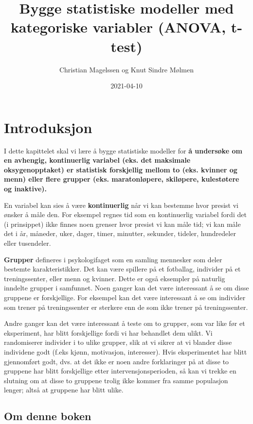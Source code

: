 \documentclass[
]{book}
\title{Bygge statistiske modeller med kategoriske variabler (ANOVA, t-test)}
\author{Christian Magelssen og Knut Sindre Mølmen}
\date{2021-04-10}
\begin{document}
\maketitle

{
\setcounter{tocdepth}{1}
\tableofcontents
}
\hypertarget{intro}{%
\chapter{Introduksjon}\label{intro}}

I dette kapittelet skal vi lære å bygge statistiske modeller for \textbf{å undersøke om en avhengig, kontinuerlig variabel (eks. det maksimale oksygenopptaket) er statistisk forskjellig mellom to (eks. kvinner og menn) eller flere grupper (eks. maratonløpere, skiløpere, kulestøtere og inaktive).}

En variabel kan sies å være \textbf{kontinuerlig} når vi kan bestemme hvor presist vi ønsker å måle den. For eksempel regnes tid som en kontinuerlig variabel fordi det (i prinsippet) ikke finnes noen grenser hvor presist vi kan måle tid; vi kan måle det i år, måneder, uker, dager, timer, minutter, sekunder, tideler, hundredeler eller tusendeler.

\textbf{Grupper} defineres i psykologifaget som en samling mennesker som deler bestemte karakteristikker. Det kan være spillere på et fotballag, individer på et treningssenter, eller menn og kvinner. Dette er også eksempler på naturlig inndelte grupper i samfunnet. Noen ganger kan det være interessant å se om disse gruppene er forskjellige. For eksempel kan det være interessant å se om individer som trener på treningssenter er sterkere enn de som ikke trener på treningssenter.

Andre ganger kan det være interessant å teste om to grupper, som var like før et eksperiment, har blitt forskjellige fordi vi har behandlet dem ulikt. Vi randomiserer individer i to ulike grupper, slik at vi sikrer at vi blander disse individene godt (f.eks kjønn, motivasjon, interesser). Hvis eksperimentet har blitt gjennomført godt, dvs. at det ikke er noen andre forklaringer på at disse to gruppene har blitt forskjellige etter intervensjonsperioden, så kan vi trekke en slutning om at disse to gruppene trolig ikke kommer fra samme populasjon lenger; altså at gruppene har blitt ulike.

\hypertarget{om-denne-boken}{%
\section{Om denne boken}\label{om-denne-boken}}
\end{document}
